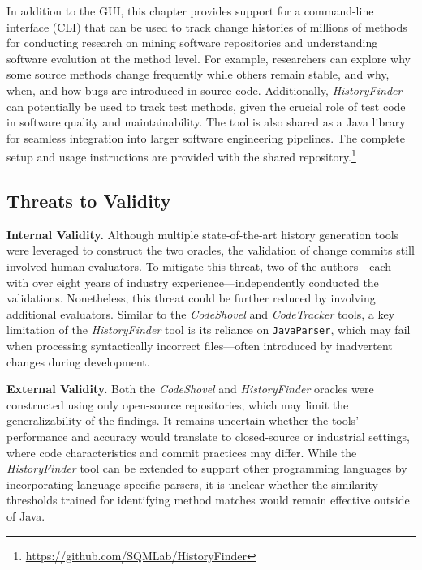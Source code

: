 In addition to the GUI, this chapter provides support for a command-line interface (CLI) that can be used to track change histories of millions of methods for conducting research on mining software repositories and understanding software evolution at the method level. For example, researchers can explore why some source methods change frequently while others remain stable, and why, when, and how bugs are introduced in source code. Additionally, \textit{HistoryFinder} can potentially be used to track test methods, given the crucial role of test code in software quality and maintainability.
The tool is also shared as a Java library for seamless integration into larger software engineering pipelines. The complete setup and usage instructions are provided with the shared repository.\footnote{\url{https://github.com/SQMLab/HistoryFinder}}

\subsection{Threats to Validity}
\textbf{Internal Validity.}
Although multiple state-of-the-art history generation tools were leveraged to construct the two oracles, the validation of change commits still involved human evaluators. To mitigate this threat, two of the authors—each with over eight years of industry experience—independently conducted the validations. Nonetheless, this threat could be further reduced by involving additional evaluators. Similar to the \textit{CodeShovel} and \textit{CodeTracker} tools, a key limitation of the \textit{HistoryFinder} tool is its reliance on \texttt{JavaParser}, which may fail when processing syntactically incorrect files—often introduced by inadvertent changes during development.

\textbf{External Validity.}
Both the \textit{CodeShovel} and \textit{HistoryFinder} oracles were constructed using only open-source repositories, which may limit the generalizability of the findings. It remains uncertain whether the tools’ performance and accuracy would translate to closed-source or industrial settings, where code characteristics and commit practices may differ. While the \textit{HistoryFinder} tool can be extended to support other programming languages by incorporating language-specific parsers, it is unclear whether the similarity thresholds trained for identifying method matches would remain effective outside of Java.
